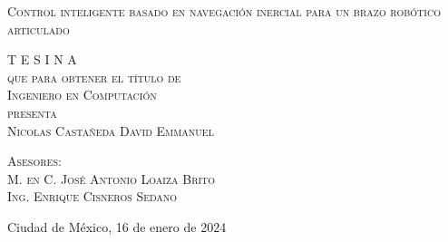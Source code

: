 \begin{minipage}[c][0.70\textheight][t]{0.7\textwidth}
	\begin{center}
		\vspace{1.5cm}
		
		{\Huge\scshape Control inteligente basado en navegaci\'on inercial para un brazo rob\'otico articulado}
		
		\vspace{3.5cm}            
		
		\textsc{\LARGE T E S I N A}\\[0.5cm]
		\textsc{\large que para obtener el t\'itulo de}\\[0.5cm]
		\textsc{\large Ingeniero en Computaci\'on}\\[0.5cm]
		\textsc{\large presenta}\\[0.5cm]
		\textsc{\large Nicolas Castañeda David Emmanuel}\\[2cm]          
		
		\vspace{1cm}
		
	\end{center}
	
	{\large\scshape Asesores:\\[0.3cm] {M. en C. Jos\'e Antonio Loaiza Brito\\ 
			Ing. Enrique Cisneros Sedano}}
	
	\vspace{0.5cm}
	
	\begin{flushright}
		\large{Ciudad de México, 16 de enero de 2024}
	\end{flushright}
\end{minipage}

\restoregeometry

\onehalfspacing